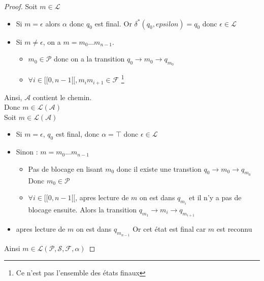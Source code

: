 \begin{proof}
    Soit $m \in \mathcal{L}$\\
    \begin{itemize}
        \item Si $m=\epsilon$ alors $\alpha$ donc $q_0$ est final. Or $\delta^*(q_0,epsilon)=q_0$ donc $\epsilon \in \mathcal{L}$
        \item Si $m\not= \epsilon$, on a $m=m_0...m_{n-1}$. \begin{itemize}
            \item $m_0 \in \mathcal{P}$ donc on a la transition $q_0 \rightarrow m_0 \rightarrow q_{m_0}$
            \item $\forall i \in [[0,n-1[[, m_im_{i+1} \in \mathcal{F}$ \footnote{Ce n'est pas l'ensemble des états finaux}
        \end{itemize}
    \end{itemize}
    Ainsi, $\mathcal{A}$ contient le chemin.\\
    Donc $m\in \mathcal{L}(\mathcal{A})$\\

    Soit $m\in\mathcal{L}(\mathcal{A})$
    \begin{itemize}
        \item Si $m=\epsilon$, $q_0$ est final, donc $\alpha = \top$ donc $\epsilon\in\mathcal{L}$
        \item Sinon : $m=m_0...m_{n-1}$ \begin{itemize}
            \item Pas de blocage en lisant $m_0$ donc il existe une transtion $q_0 \rightarrow m_0 \rightarrow q_{m_0}$ Donc $m_0\in \mathcal{P}$
            \item $\forall i \in [[0,n-1[[$, apres lecture de $m$ on est dans $q_{m_i}$ et il n'y a pas de blocage ensuite. Alors la transition  $q_{m_1} \rightarrow m_i \rightarrow q_{m_{i+1}}$
        \end{itemize}
        \item apres lecture de $m$ on est dans $q_{m_{n-1}}$ Or cet état est final car $m$ est reconnu
    \end{itemize}
    Ainsi $m\in\mathcal{L}(\mathcal{P},\mathcal{S},\mathcal{F},\alpha)$
\end{proof}










